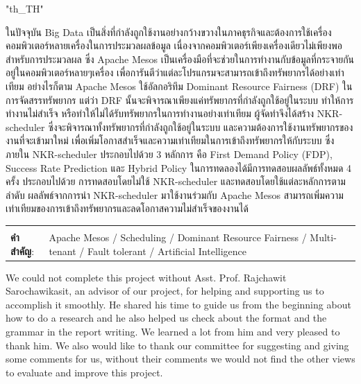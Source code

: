 \documentclass[12pt,oneside,openright,a4paper]{cpe-english-project}
\begin{document}
{
\XeTeXlinebreaklocale "th_TH"	
\thaifont
\thaiabstract

\hspace{10mm}ในปัจจุบัน Big Data เป็นสิ่งที่กำลังถูกใช้งานอย่างกว้างขวางในภาคธุรกิจและต้องการใช้เครื่องคอมพิวเตอร์หลายเครื่องในการประมวลผลข้อมูล เนื่องจากคอมพิวเตอร์เพียงเครื่องเดียวไม่เพียงพอสำหรับการประมวลผล ซึ่ง Apache Mesos เป็นเครื่องมือที่จะช่วยในการทำงานกับข้อมูลที่กระจายกันอยู่ในคอมพิวเตอร์หลายๆเครื่อง เพื่อการันตีว่าแต่ละโปรแกรมจะสามารถเข้าถึงทรัพยากรได้อย่างเท่าเทียม อย่างไรก็ตาม Apache Mesos ใช้อัลกอริทึม Dominant Resource Fairness (DRF) ในการจัดสรรทรัพยากร แต่ว่า DRF นั้นจะพิจารณาเพียงแค่ทรัพยากรที่กำลังถูกใช้อยู่ในระบบ ทำให้การทำงานไม่สำเร็จ หรือทำให้ไม่ได้รับทรัพยากรในการทำงานอย่างเท่าเทียม ผู้จัดทำจึงได้สร้าง NKR-scheduler ซึ่งจะพิจารณาทั้งทรัพยากรที่กำลังถูกใช้อยู่ในระบบ และความต้องการใช้งานทรัพยากรของงานที่จะเข้ามาใหม่ เพื่อเพิ่มโอกาสสำเร็จและความเท่าเทียมในการเข้าถึงทรัพยากรให้กับระบบ ซึ่งภายใน NKR-scheduler ประกอบไปด้วย 3 หลักการ คือ First Demand Policy (FDP), Success Rate Prediction และ Hybrid Policy ในการทดลองได้มีการทดสอบผลลัพธ์ทั้งหมด 4 ครั้ง ประกอบไปด้วย การทดสอบโดยไม่ใช้  NKR-scheduler และทดสอบโดยใช้แต่ละหลักการตามลำดับ ผลลัพธ์จากการนำ NKR-scheduler มาใช้งานร่วมกับ Apache Mesos สามารถเพิ่มความเท่าเทียมของการเข้าถึงทรัพยากรและลดโอกาสความไม่สำเร็จของงานได้

\begin{flushleft}
\begin{tabular*}{\textwidth}{@{}lp{}}
 & \\

\textbf{คำสำคัญ}: & Apache Mesos / Scheduling / Dominant Resource Fairness / Multi-tenant / Fault tolerant / Artificial Intelligence 
\end{tabular*}
\end{flushleft}
\endabstract
}

\preface
\hspace{10mm}We could not complete this project without Asst. Prof. Rajchawit Sarochawikasit, an advisor of our project, for helping and supporting us to accomplish it smoothly. He shared his time to guide us from the beginning about how to do a research and he also helped us check about the format and the grammar in the report writing. We learned a lot from him and very pleased to thank him. We also would like to thank our committee for suggesting and giving some comments for us, without their comments we would not find the other views to evaluate and improve this project. 
\end{document}
